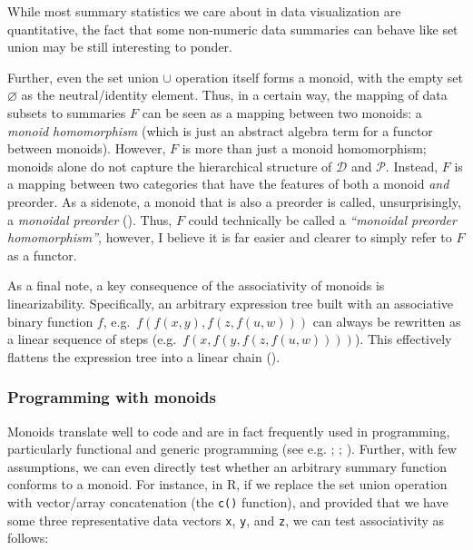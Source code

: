 \documentclass[
  openany]{book}
\theoremstyle{definition}
\theoremstyle{definition}
\theoremstyle{definition}
\theoremstyle{definition}
\theoremstyle{remark}
\begin{document}
While most summary statistics we care about in data visualization are quantitative, the fact that some non-numeric data summaries can behave like set union may be still interesting to ponder.

Further, even the set union \(\cup\) operation itself forms a monoid, with the empty set \(\varnothing\) as the neutral/identity element. Thus, in a certain way, the mapping of data subsets to summaries \(F\) can be seen as a mapping between two monoids: a \emph{monoid homomorphism} (which is just an abstract algebra term for a functor between monoids). However, \(F\) is more than just a monoid homomorphism; monoids alone do not capture the hierarchical structure of \(\mathcal{D}\) and \(\mathcal{P}\). Instead, \(F\) is a mapping between two categories that have the features of both a monoid \emph{and} preorder. As a sidenote, a monoid that is also a preorder is called, unsurprisingly, a \emph{monoidal preorder} (). Thus, \(F\) could technically be called a \emph{``monoidal preorder homomorphism''}, however, I believe it is far easier and clearer to simply refer to \(F\) as a functor.

As a final note, a key consequence of the associativity of monoids is linearizability. Specifically, an arbitrary expression tree built with an associative binary function \(f\), e.g.~\(f(f(x, y), f(z, f(u, w)))\) can always be rewritten as a linear sequence of steps (e.g.~\(f(x, f(y, f(z, f(u, w))))\)). This effectively flattens the expression tree into a linear chain ().

\subsubsection{Programming with monoids}\label{programming-with-monoids}

Monoids translate well to code and are in fact frequently used in programming, particularly functional and generic programming (see e.g. ; ; ). Further, with few assumptions, we can even directly test whether an arbitrary summary function conforms to a monoid. For instance, in R, if we replace the set union operation with vector/array concatenation (the \texttt{c()} function), and provided that we have some three representative data vectors \texttt{x}, \texttt{y}, and \texttt{z}, we can test associativity as follows:
\end{document}
